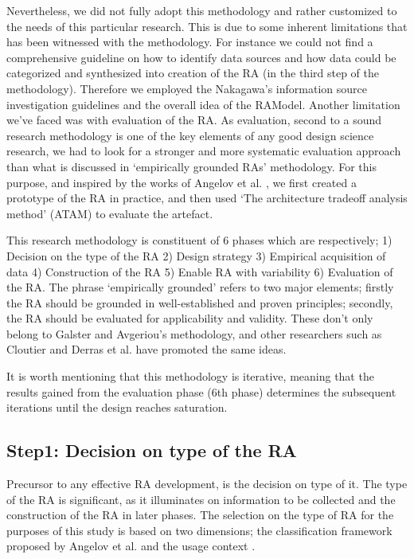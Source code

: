 \documentclass{bmcart}
\begin{document}
Nevertheless, we did not fully adopt this methodology and rather customized to the needs of this particular research. This is due to some inherent limitations that has been witnessed with the methodology. For instance we could not find a comprehensive guideline on how to identify data sources and how data could be categorized and synthesized into creation of the RA (in the third step of the methodology). Therefore we employed the Nakagawa's information source investigation guidelines and the overall idea of the RAModel. Another limitation we've faced was with evaluation of the RA. As evaluation, second to a sound research methodology is one of the key elements of any good design science research, we had to look for a stronger and more systematic evaluation approach than what is discussed in `empirically grounded RAs' methodology. For this purpose, and inspired by the works of Angelov et al. \cite{angelov2008towards,angelov2014extending}, we first created a prototype of the RA in practice, and then used `The architecture tradeoff analysis method' (ATAM) \cite{kazman1998architecture} to evaluate the artefact.

This research methodology is constituent of 6 phases which are respectively; 1) Decision on the type of the RA 2) Design strategy 3) Empirical acquisition of data 4) Construction of the RA 5) Enable RA with variability 6) Evaluation of the RA. The phrase `empirically grounded' refers to two major elements; firstly the RA should be grounded in well-established and proven principles; secondly, the RA should be evaluated for applicability and validity. These don't only belong to Galster and Avgeriou's methodology, and other researchers such as Cloutier \cite{Cloutier} and Derras et al. \cite{Derras} have promoted the same ideas.

It is worth mentioning that this methodology is iterative, meaning that the results gained from the evaluation phase (6th phase) determines the subsequent iterations until the design reaches saturation.

\subsection{Step1: Decision on type of the RA}

Precursor to any effective RA development, is the decision on type of it. The type of the RA is significant, as it illuminates on information to be collected and the construction of the RA in later phases. The selection on the type of RA for the purposes of this study is based on two dimensions; the classification framework proposed by Angelov et al. \cite{angelov2009classification} and the usage context \cite{angelov2008contracting}.
\end{document}
